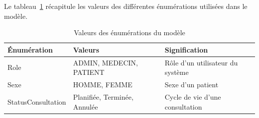 Le tableau~\ref{tab:enums} récapitule les valeurs des différentes énumérations utilisées dans le modèle.

\begin{table}[H]
\centering
\begin{tabularx}{\textwidth}{l l X}
\toprule
\textbf{Énumération} & \textbf{Valeurs} & \textbf{Signification} \\
\midrule
Role & ADMIN, MEDECIN, PATIENT & Rôle d'un utilisateur du système \\
Sexe & HOMME, FEMME & Sexe d'un patient \\
StatusConsultation & Planifiée, Terminée, Annulée & Cycle de vie d'une consultation \\
\bottomrule
\end{tabularx}
\caption{Valeurs des énumérations du modèle}
\label{tab:enums}
\end{table}
